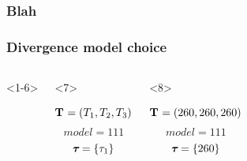 \begin{frame}
    \frametitle<1-6>{Blah}
    \frametitle<7->{Divergence model choice}
    \begin{columns}[c]
        \begin{onlyenv}<1-6>
            \begin{minipage}[c][0.5\textheight][c]{\linewidth}
            \end{minipage}
        \end{onlyenv}
        \begin{onlyenv}<7>
            \begin{minipage}[c][0.5\textheight][c]{\linewidth}
                \begin{displaybox}[0.95\linewidth]
                    \begin{minipage}[c][0.45\textheight][c]{0.95\linewidth}
                        \[
                            \mathbf{T_{}} = (T_{1},T_{2},T_{3})
                        \]\vspace{0mm}
                        \[
                            model = 111
                        \]\vspace{0mm}
                        \[
                            \boldsymbol{\tau_{}} = \{\tau_{1}\}
                        \]\vspace{0mm}
                    \end{minipage}
                \end{displaybox}
            \end{minipage}
        \end{onlyenv}
        \begin{onlyenv}<8>
            \begin{minipage}[c][0.5\textheight][c]{\linewidth}
                \begin{displaybox}[0.95\linewidth]
                    \begin{minipage}[c][0.45\textheight][c]{0.95\linewidth}
                        \[
                            \mathbf{T_{}} = (260,260,260)
                        \]\vspace{0mm}
                        \[
                            model = 111
                        \]\vspace{0mm}
                        \[
                            \boldsymbol{\tau_{}} = \{260\}
                        \]\vspace{0mm}
                    \end{minipage}

\end{displaybox}
\end{minipage}
\end{onlyenv}
\end{columns}
\end{frame}
